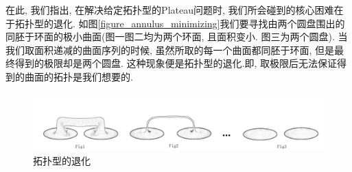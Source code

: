 在此, 我们指出, 在解决给定拓扑型的Plateau问题时, 我们所会碰到的核心困难在于拓扑型的退化. 如图\eqref{figure_annulus_minimizing}我们要寻找由两个圆盘围出的同胚于环面的极小曲面(图一图二均为两个环面, 且面积变小. 图三为两个圆盘). 当我们取面积递减的曲面序列的时候, 虽然所取的每一个曲面都同胚于环面, 但是最终得到的极限却是两个圆盘. 这种现象便是拓扑型的退化.即, 取极限后无法保证得到的曲面的拓扑是我们想要的.
\begin{figure}[ht]
    \centering
    \includegraphics[scale=0.8]{images/annulus_minimizing.png}
    \caption{拓扑型的退化}
    \label{figure_annulus_minimizing}
\end{figure}

